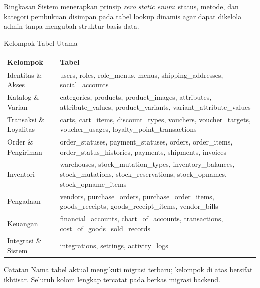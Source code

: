 
\begin{flowsection}{Ringkasan}
Sistem menerapkan prinsip \emph{zero static enum}: status, metode, dan kategori
pembukuan disimpan pada tabel lookup dinamis agar dapat dikelola admin tanpa
mengubah struktur basis data.
\end{flowsection}

\begin{flowsection}{Kelompok Tabel Utama}
\begin{center}
\renewcommand{\arraystretch}{1.3}
\begin{tabular}{|p{4.2cm}|p{10cm}|}
\hline
\textbf{Kelompok} & \textbf{Tabel} \\ \hline
Identitas \& Akses & users, roles, role\_menus, menus, shipping\_addresses, social\_accounts \\ \hline
Katalog \& Varian & categories, products, product\_images, attributes, attribute\_values, product\_variants, variant\_attribute\_values \\ \hline
Transaksi \& Loyalitas & carts, cart\_items, discount\_types, vouchers, voucher\_targets, voucher\_usages, loyalty\_point\_transactions \\ \hline
Order \& Pengiriman & order\_statuses, payment\_statuses, orders, order\_items, order\_status\_histories, payments, shipments, invoices \\ \hline
Inventori & warehouses, stock\_mutation\_types, inventory\_balances, stock\_mutations, stock\_reservations, stock\_opnames, stock\_opname\_items \\ \hline
Pengadaan & vendors, purchase\_orders, purchase\_order\_items, goods\_receipts, goods\_receipt\_items, vendor\_bills \\ \hline
Keuangan & financial\_accounts, chart\_of\_accounts, transactions, cost\_of\_goods\_sold\_records \\ \hline
Integrasi \& Sistem & integrations, settings, activity\_logs \\ \hline
\end{tabular}
\end{center}
\end{flowsection}

\begin{flowsection}{Catatan}
Nama tabel aktual mengikuti migrasi terbaru; kelompok di atas bersifat ikhtisar.
Seluruh kolom lengkap tercatat pada berkas migrasi backend.
\end{flowsection}


